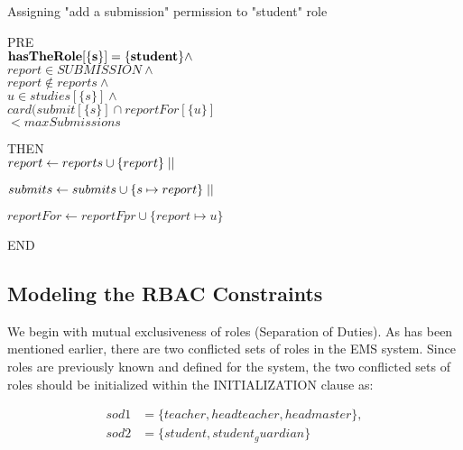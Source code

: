 \begin{algorithm}                      %
\caption{Assigning "add a submission" permission to "student" role}          %
\label{alg1}                          


PRE \\

\quad ${\bf hasTheRole[\{s\}] = \{student\}} \wedge$\\
 
\quad $report \in SUBMISSION \wedge$ \\

\quad $report \notin reports \wedge$ \\

\quad $u \in studies [\{s\}] \wedge$ \\

\quad $card(submit[\{s\}] \cap reportFor[\{u\}]$ \\

\quad $< maxSubmissions$
 


THEN \\ 

\quad $report \gets reports \cup \{report\} \mid\mid \\$

\quad $submits \gets submits \cup \{s \mapsto report\} \mid\mid \\$

\quad $reportFor \gets reportFpr \cup \{report \mapsto u\}$
 

END
\end{algorithm} 


\subsection{Modeling the RBAC Constraints}

     We begin with mutual exclusiveness of roles  (Separation of Duties).  As has been mentioned earlier, there are two conflicted sets of roles in the EMS system.  Since roles are previously known and defined for the system, the two conflicted sets of roles should be initialized within the INITIALIZATION clause as:

\begin{align*}
sod1 &= \{teacher, headteacher, headmaster\}, \\
sod2 &= \{student, student_guardian\}
\end{align*}

